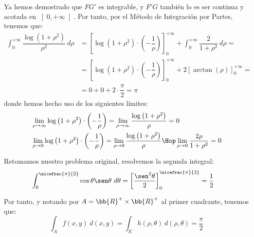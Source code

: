 \begin{ejercicio}
    Ya hemos demostrado que $FG'$ es integrable, y $F'G$ también lo es ser continua y acotada en $\left]0, +\infty\right[$. Por tanto, por el Método de Integración por Partes, tenemos que:
    \begin{align*}
        \int_0^{+\infty} \dfrac{\log\left(1+\rho^2\right)}{\rho^2}~d\rho &= \left[\log\left(1+\rho^2\right)\cdot \left(-\dfrac{1}{\rho}\right)\right]_0^{+\infty} + \int_0^{+\infty} \dfrac{2}{1+\rho^2}~d\rho =\\
        &= \left[\log\left(1+\rho^2\right)\cdot \left(-\dfrac{1}{\rho}\right)\right]_0^{+\infty} + 2\left[\arctan(\rho)\right]_0^{+\infty} =\\
        &= 0 + 0 +2\cdot \dfrac{\pi}{2} = \pi
    \end{align*}
    donde hemos hecho uso de los siguientes límites:
    \begin{align*}
        &\lim_{\rho\to \infty} \log\left(1+\rho^2\right)\cdot \left(-\dfrac{1}{\rho}\right) = \lim_{\rho\to \infty} \dfrac{\log\left(1+\rho^2\right)}{\rho} = 0\\
        &\lim_{\rho\to 0} \log\left(1+\rho^2\right)\cdot \left(-\dfrac{1}{\rho}\right) = \lim_{\rho\to 0} \dfrac{\log\left(1+\rho^2\right)}{\rho} \Hop \lim_{\rho\to 0} \dfrac{2\rho}{1+\rho^2} = 0
    \end{align*}

    Retomamos nuestro problema original, resolvemos la segunda integral:
    \begin{align*}
        \int_0^{\nicefrac{\pi}{2}} \cos\theta\sen\theta~d\theta &= \left[\dfrac{\sen^2\theta}{2}\right]_0^{\nicefrac{\pi}{2}} = \dfrac{1}{2}
    \end{align*}

    Por tanto, y notando por $A=\bb{R}^+\times \bb{R}^+$ al primer cuadrante, tenemos que:
    \begin{equation*}
        \int_A f(x, y)~d(x, y) = \int_E h(\rho, \theta)~d(\rho, \theta) = \dfrac{\pi}{2}
    \end{equation*}
    
\end{ejercicio}



